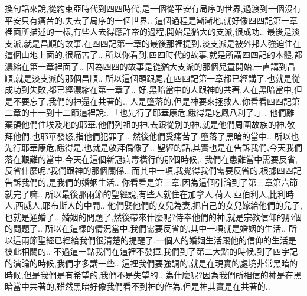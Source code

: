 \documentclass{book}
\begin{document}
換句話來說,從約束亞時代到四四時代,是一個從平安有局序的世界,過渡到一個沒有平安只有痛苦的,失去了局序的一個世界..
這個過程是漸漸地,就好像四四記第一章裡面所描述的一樣,有些人去得應許帝的過程,開始是猶大的支派,很成功..
最後是淡支派,就是昌順的故事,在四四記第一章的最後那裡提到,淡支派是被外邦人強迫住在這個山地上面的,很痛苦了..
所以你看到,四四時代的故事,就是所謂四四記的本體,都濃縮在第一章裡面了..
因為四四的故事是從猶大支派的那個兒童開始,一直講到昌順,就是淡支派的那個昌順..
所以這個頭跟尾,在四四記第一章都已經講了,也就是從成功到失敗,都已經濃縮在第一章了..
好,黑暗當中的人跟神的共著,人在黑暗當中,但是不要忘了,我們的神還在共著的..
人是墮落的,但是神要來拯救人.你看看四四記第二章的十一到十二節這裡說:.
「也先行了耶華康危,餓得是吃鳳八利了.」.
他們離棄領他們住埃及地的耶華,他們列祖的神,去跟從別的神,就是他們周圍故族的神,敬拜他們,也耶華發怒,指他們犯罪了..
然後他們受痛苦了,墮落了黑暗的當中..
所以也先行耶華康危,餓得是,也就是敬拜偶像了..
聖經的話,其實也是在告訴我們,今天我們落在艱難的當中,今天在這個新冠病毒橫行的那個時候,.
我們在患難當中需要反省,反省什麼呢?我們跟神的那個關係..
而其中一項,我覺得我們需要反省的,根據四四記告訴我們的,是我們的婚姻生活..
你看看是第三章,因為這個引論到了第三章第六節就完了嘛..
所以最後那兩節的聖經說,有些人就住在加拿人,荷人,亞伯利人,比利時人,西威人,耶布斯人的中間..
他們娶他們的女兒為妻,把自己的女兒嫁給他們的兒子,也就是通婚了..
婚姻的問題了,然後帶來什麼呢?侍奉他們的神,就是宗教信仰的那個的問題了..
所以在這樣的情況當中,我們需要反省的,其中一項就是婚姻的生活..
所以這兩節聖經已經給我們很清楚的提醒了,一個人的婚姻生活跟他的信仰的生活是彼此相關的..
不過這一點我們在這裡不發揮,我們到了第二大點的時候,到了四字記的演論的時候,我們才多講一些..
這裡我們要強調的,就是在現實的處境非常黑暗的時候,但是我們是有希望的,我們不是失望的..
為什麼呢?因為我們所相信的神是在黑暗當中共著的,雖然黑暗好像我們看不到神的作為,但是神其實是在共著的..
\end{document}
